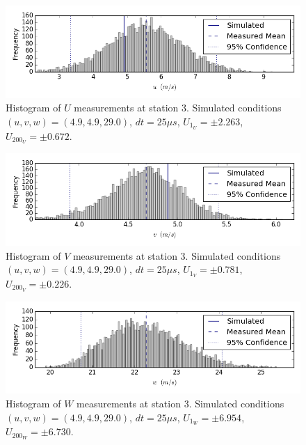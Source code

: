 \begin{figure}[H]
\centering
\includegraphics[width=6in]{figs/Ely_May28th03001/uncertainty_Ely_May28th03001_U}
\caption{Histogram of $U$ measurements at station 3. Simulated conditions 
$(u,v,w)=(4.9, 4.9, 29.0)$, $dt=25 \mu s$, $U_{1_{U}}=\pm 2.263$, 
$U_{200_{U}}=\pm 0.672$.}
\label{fig:uncertainty_Ely_May28th03001_U}
\end{figure}


\begin{figure}[H]
\centering
\includegraphics[width=6in]{figs/Ely_May28th03001/uncertainty_Ely_May28th03001_V}
\caption{Histogram of $V$ measurements at station 3. Simulated conditions 
$(u,v,w)=(4.9, 4.9, 29.0)$, $dt=25 \mu s$, $U_{1_{V}}=\pm 0.781$, 
$U_{200_{V}}=\pm 0.226$.}
\label{fig:uncertainty_Ely_May28th03001_V}
\end{figure}


\begin{figure}[H]
\centering
\includegraphics[width=6in]{figs/Ely_May28th03001/uncertainty_Ely_May28th03001_W}
\caption{Histogram of $W$ measurements at station 3. Simulated conditions 
$(u,v,w)=(4.9, 4.9, 29.0)$, $dt=25 \mu s$, $U_{1_{W}}=\pm 6.954$, 
$U_{200_{W}}=\pm 6.730$.}
\label{fig:uncertainty_Ely_May28th03001_W}
\end{figure}


